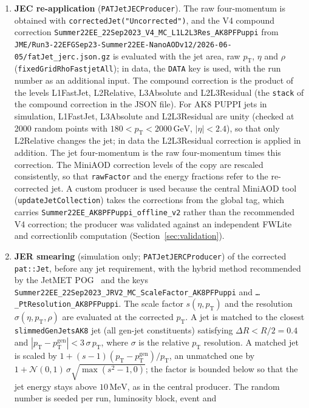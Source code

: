\documentclass[11pt]{article}
\newcommand{\pt}{p_{\mathrm{T}}}
\newcommand{\GeV}{\ensuremath{\,\mathrm{GeV}}}
\newcommand{\code}[1]{\texttt{#1}}
\begin{document}
\begin{enumerate}
\item \textbf{JEC re-application} (\code{PATJetJECProducer}). The raw four-momentum is obtained with
  \code{correctedJet("Uncorrected")}, and the V4 compound correction \code{Summer22EE\_22Sep2023\_V4\_MC\_L1L2L3Res\_AK8PFPuppi}
  from \code{JME/Run3-22EFGSep23-Summer22EE-NanoAODv12/2026-06-05/fatJet\_jerc.json.gz} is evaluated with the jet area,
  raw $\pt$, $\eta$ and $\rho$ (\code{fixedGridRhoFastjetAll}); in data, the \code{DATA} key is used, with the run
  number as an additional input. The compound correction is the product of the levels L1FastJet, L2Relative,
  L3Absolute and L2L3Residual (the \code{stack} of the compound correction in the JSON file). For AK8 PUPPI jets in
  simulation, L1FastJet, L3Absolute and L2L3Residual are unity (checked at 2000 random points with
  $180 < \pt < 2000\GeV$, $|\eta| < 2.4$), so that only L2Relative changes the jet; in data the L2L3Residual
  correction is applied in addition. The jet four-momentum is the raw four-momentum times this correction. The
  MiniAOD correction levels of the copy are rescaled consistently, so that \code{rawFactor} and the energy fractions
  refer to the re-corrected jet. A custom producer is used because the central MiniAOD tool
  (\code{updateJetCollection}) takes the corrections from the global tag, which carries
  \code{Summer22EE\_AK8PFPuppi\_offline\_v2} rather than the recommended V4 correction; the producer was validated
  against an independent FWLite and correctionlib computation (Section~\ref{sec:validation}).
\item \textbf{JER smearing} (simulation only; \code{PATJetJERCProducer}) of the corrected \code{pat::Jet}, before any
  jet requirement, with the hybrid method recommended by the JetMET POG~\cite{JMEjerc} and the keys
  \code{Summer22EE\_22Sep2023\_JRV2\_MC\_ScaleFactor\_AK8PFPuppi} and \code{\dots\_PtResolution\_AK8PFPuppi}. The scale
  factor $s(\eta, \pt)$ and the resolution $\sigma(\eta, \pt, \rho)$ are evaluated at the corrected $\pt$. A jet is
  matched to the closest \code{slimmedGenJetsAK8} jet (all gen-jet constituents) satisfying $\Delta R < R/2 = 0.4$ and
  $|\pt - \pt^\mathrm{gen}| < 3\,\sigma\,\pt$, where $\sigma$ is the relative $\pt$ resolution. A matched jet is
  scaled by $1 + (s-1)(\pt - \pt^\mathrm{gen})/\pt$, an unmatched one by
  $1 + \mathcal{N}(0,1)\,\sigma\sqrt{\max(s^2-1, 0)}$; the factor is bounded below so that the jet energy stays above
  $10\,\mathrm{MeV}$, as in the central producer. The random number is seeded per run, luminosity block, event and

\end{enumerate}
\end{document}
